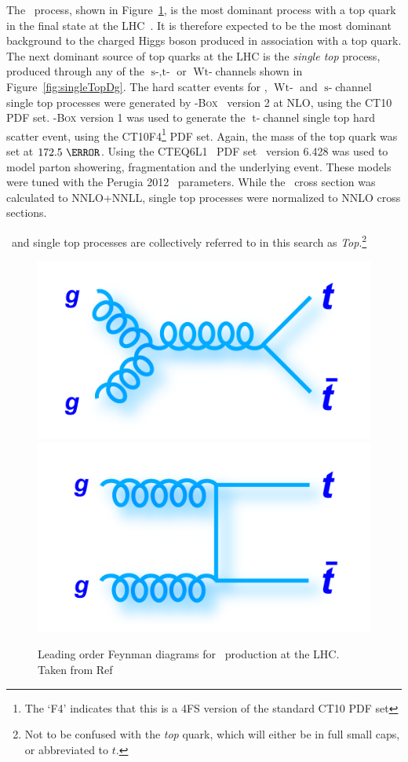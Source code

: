 \par The \ttbar\ process, shown in Figure~\ref{fig:ttBarDg}, is the most dominant process 
with a top quark in the final state at the 
LHC~\cite{Aad:2015eia}. It is therefore expected to be the most dominant background to the charged Higgs boson 
produced in association with a top quark.
The next dominant source of top quarks at the LHC is the {\it single top} process, 
produced through any of the $\operatorname{s-,t-}$ or $\operatorname{Wt-}$channels shown in Figure~\ref{fig:singleTopDg}.
The hard scatter events for \ttbar, $\operatorname{Wt-}$ and $\operatorname{s-}$channel single top processes 
were generated by \POWHEG-\textsc{Box}~\cite{PowhegBox, Alioli:2008tz,Powheg0,Powheg1,Powheg2} version 2
 at NLO, using the CT10~\cite{Lai:2010vv, Gao:2013xoa} PDF set.  
\POWHEG-\textsc{Box} version 1 was used to generate the $\operatorname{t-}$channel single top hard scatter event, 
using the CT10F4\footnote{The `F4' indicates that this is a 4FS version of the standard CT10 PDF set}
 PDF set. Again, the mass of the top quark was set at $172.5~\GeV$. 
Using the CTEQ6L1~\cite{Nadolsky:2008zw} PDF set \PYTHIA\ version 6.428 was used to model parton showering, 
fragmentation and the underlying event. These models were tuned with the Perugia 2012~\cite{Skands:2010ak} parameters. 
While the \ttbar\ cross section was calculated to NNLO+NNLL, 
single top processes were normalized to NNLO cross sections.   

\par \ttbar\ and single top processes are collectively referred to in this search 
as {\it Top}.\footnote{Not to be confused with the {\it top} quark, which will either be 
in full small caps, or abbreviated to $t$.}

\begin{figure}[h]
   \includegraphics[width=.5\textwidth]{figures/feynman_ttbar_LHC_gggtt.png}
   \includegraphics[width=.5\textwidth]{figures/feynman_ttbar_LHC_ggttt.png}
\caption{Leading order Feynman diagrams for \ttbar\ production at the LHC. Taken from 
Ref~\cite{D0:ttBarFeyn}}
\label{fig:ttBarDg}
\end{figure} %

